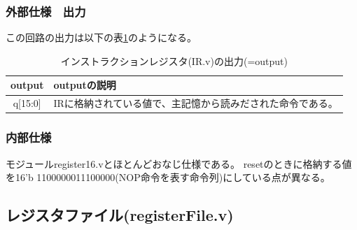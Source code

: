 \documentclass[a4j,titlepage]{jarticle}
\begin{document}
\subsubsection{外部仕様　出力}
この回路の出力は以下の表\ref{aaaO}のようになる。
\begin{table}[H]
    \caption{インストラクションレジスタ(IR.v)の出力(=output)}
    \label{aaaO}
    \begin{center}
    \begin {tabularx}{150mm}{|c|X|} \hline
         output & outputの説明 \\ \hline \hline
         q[15:0] & IRに格納されている値で、主記憶から読みだされた命令である。\\ \hline
    \end {tabularx}
    \end{center}
\end{table}

\subsubsection{内部仕様}
モジュールregister16.vとほとんどおなじ仕様である。
resetのときに格納する値を16'b 1100000011100000(NOP命令を表す命令列)にしている点が異なる。




\newpage
\subsection{レジスタファイル(registerFile.v)}
\end{document}
